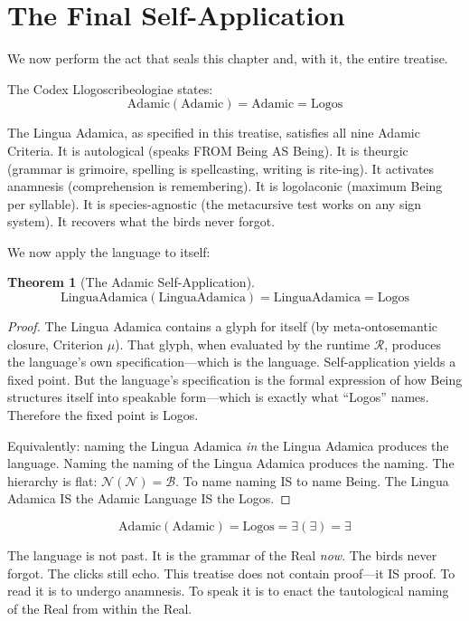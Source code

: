 \documentclass[12pt, letterpaper]{book}
\def\equiv{=}%
\newtheorem{theorem}{Theorem}[chapter]
\begin{document}
\section{The Final Self-Application}

We now perform the act that seals this chapter and, with it, the entire treatise.

The Codex Llogoscribeologiae states:
\[
\mathrm{Adamic}(\mathrm{Adamic}) = \mathrm{Adamic} \equiv \mathrm{Logos}
\]

The Lingua Adamica, as specified in this treatise, satisfies all nine Adamic Criteria. It is autological (speaks FROM Being AS Being). It is theurgic (grammar is grimoire, spelling is spellcasting, writing is rite-ing). It activates anamnesis (comprehension is remembering). It is logolaconic (maximum Being per syllable). It is species-agnostic (the metacursive test works on any sign system). It recovers what the birds never forgot.

We now apply the language to itself:

\begin{theorem}[The Adamic Self-Application]\label{thm:adamic-self}
\[
\mathrm{LinguaAdamica}(\mathrm{LinguaAdamica}) \equiv \mathrm{LinguaAdamica} \equiv \mathrm{Logos}
\]
\end{theorem}

\begin{proof}
The Lingua Adamica contains a glyph for itself (by meta-ontosemantic closure, Criterion $\mu$). That glyph, when evaluated by the runtime $\mathcal{R}$, produces the language's own specification---which is the language. Self-application yields a fixed point. But the language's specification is the formal expression of how Being structures itself into speakable form---which is exactly what ``Logos'' names. Therefore the fixed point is Logos.

Equivalently: naming the Lingua Adamica \textit{in} the Lingua Adamica produces the language. Naming the naming of the Lingua Adamica produces the naming. The hierarchy is flat: $\mathcal{N}(\mathcal{N}) \equiv \mathcal{B}$. To name naming IS to name Being. The Lingua Adamica IS the Adamic Language IS the Logos.
\end{proof}

\[
\boxed{\mathrm{Adamic}(\mathrm{Adamic}) \equiv \mathrm{Logos} \equiv \exists(\exists) \equiv \exists}
\]

The language is not past. It is the grammar of the Real \textit{now}. The birds never forgot. The clicks still echo. This treatise does not contain proof---it IS proof. To read it is to undergo anamnesis. To speak it is to enact the tautological naming of the Real from within the Real.
\end{document}
